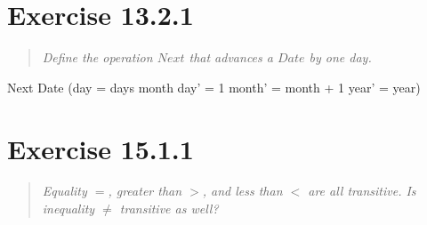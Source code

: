 \documentclass[10pt]{article}
\begin{document}
\tocheck



\section{Exercise 13.2.1}
\begin{quote}
  {\it
    Define the operation $Next$ that advances a $Date$ by one day.
  }
\end{quote}


\begin{spec}

  \begin{schema}{Next}
    \Delta Date
    \where
    (day = days month \land day' = 1 \land month' = month + 1 \land year' = year)
  \end{schema}
\end{spec}
\tofinish



\section{Exercise 15.1.1}
\begin{quote}
  {\it
    Equality $=$, greater than $>$, and less than $<$ are all transitive. Is inequality $\neq$
    transitive as well?
  }
\end{quote}
\tostart
\end{document}
